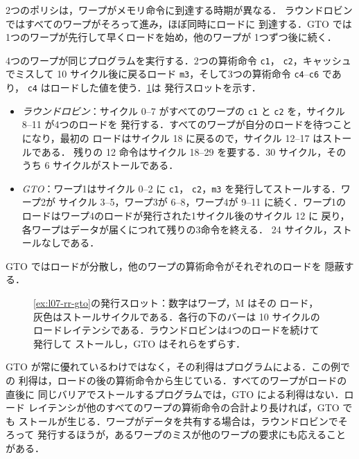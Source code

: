 \documentclass[../main.tex]{subfiles}
\begin{document}
%
2つのポリシは，ワープがメモリ命令に到達する時期が異なる．
ラウンドロビンではすべてのワープがそろって進み，ほぼ同時にロードに
到達する．GTO では1つのワープが先行して早くロードを始め，他のワープが
1つずつ後に続く．

\begin{example}
  \label{ex:l07-rr-gto}
  4つのワープが同じプログラムを実行する．2つの算術命令 \texttt{c1}，
  \texttt{c2}，キャッシュでミスして 10 サイクル後に戻るロード
  \texttt{m3}，そして3つの算術命令 \texttt{c4}--\texttt{c6} であり，
  \texttt{c4} はロードした値を使う．\cref{fig:l07-rr-gto}は
  発行スロットを示す．
  \begin{itemize}
    \item \emph{ラウンドロビン}：サイクル 0--7 がすべてのワープの
      \texttt{c1} と \texttt{c2} を，サイクル 8--11 が4つのロードを
      発行する．すべてのワープが自分のロードを待つことになり，最初の
      ロードはサイクル 18 に戻るので，サイクル 12--17 はストールである．
      残りの 12 命令はサイクル 18--29 を要する．30 サイクル，そのうち
      6 サイクルがストールである．
    \item \emph{GTO}：ワープ1はサイクル 0--2 に \texttt{c1}，
      \texttt{c2}，\texttt{m3} を発行してストールする．ワープ2が
      サイクル 3--5，ワープ3が 6--8，ワープ4が 9--11 に続く．ワープ1の
      ロードはワープ4のロードが発行された1サイクル後のサイクル 12 に
      戻り，各ワープはデータが届くにつれて残りの3命令を終える．
      24 サイクル，ストールなしである．
  \end{itemize}
  GTO ではロードが分散し，他のワープの算術命令がそれぞれのロードを
  隠蔽する．
\end{example}

\begin{figure}[tb]
  \centering
  
  \caption{\cref{ex:l07-rr-gto}の発行スロット：数字はワープ，M はその
    ロード，灰色はストールサイクルである．各行の下のバーは 10 サイクルの
    ロードレイテンシである．ラウンドロビンは4つのロードを続けて発行して
    ストールし，GTO はそれらをずらす．}
  \label{fig:l07-rr-gto}
\end{figure}

GTO が常に優れているわけではなく，その利得はプログラムによる．この例での
利得は，ロードの後の算術命令から生じている．すべてのワープがロードの直後に
同じバリアでストールするプログラムでは，GTO による利得はない．ロード
レイテンシが他のすべてのワープの算術命令の合計より長ければ，GTO でも
ストールが生じる．ワープがデータを共有する場合は，ラウンドロビンでそろって
発行するほうが，あるワープのミスが他のワープの要求にも応えることがある．
\end{document}
